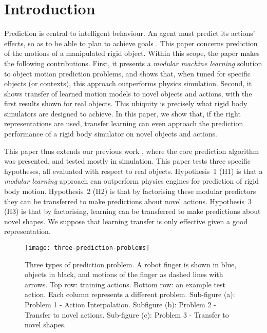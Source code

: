 \section{Introduction}\label{sec:Introduction}

Prediction is central to intelligent behaviour. An agent must predict its actions' effects, so as to be able to plan to achieve goals \citep{craik1967nature}. This paper concerns prediction of the motions of a manipulated rigid object. Within this scope, the paper makes the following contributions. First, it presents a {\em modular machine learning} solution to object motion prediction problems, and shows that, when tuned for specific objects (or contexts), this approach outperforms physics simulation.  Second, it shows transfer of learned motion models to novel objects and actions, with the first results shown for real objects. This ubiquity is precisely what rigid body simulators are designed to achieve. In this paper, we show that, if the right representations are used, transfer learning can even approach the prediction performance of a rigid body simulator on novel objects and actions.

This paper thus extends our previous work \citep{kopicki_prediction_2010,kopicki-etal-icra11},  where the core prediction algorithm was presented, and tested mostly in simulation.  This paper tests three specific hypotheses, all evaluated with respect to real objects. Hypothesis~1 (H1) is that a {\em modular learning} approach can outperform physics engines for prediction of rigid body motion.  Hypothesis~2 (H2) is that by factorising these modular predictors they can be transferred to make predictions about novel actions. Hypothesis~3 (H3) is that by factorising, learning can be transferred  to make predictions about novel shapes. We suppose that learning transfer is only effective given a good representation.

\def\stackalignment{l}
\begin{figure*}[t!]
\centerline{\texttt{[image: three-prediction-problems]}}
\caption{Three types of prediction problem. A robot finger is shown in blue, objects in black, and motions of the finger as dashed lines with arrows. Top row: training actions. Bottom row: an example test action. Each column represents a different problem. Sub-figure (a): Problem 1 - Action Interpolation. Subfigure (b): Problem 2 - Transfer to novel actions. Sub-figure (c): Problem 3 - Transfer to novel shapes. \label{fig:three-prediction-problems}}
\end{figure*}

